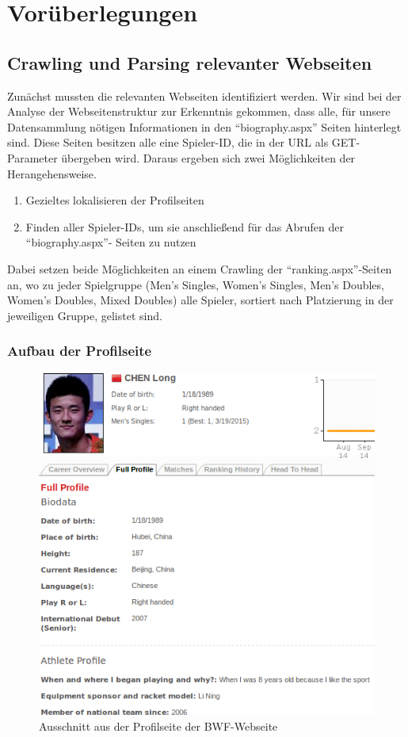 \chapter{Vorüberlegungen}
\section{Crawling und Parsing relevanter Webseiten}
Zunächst mussten die relevanten Webseiten identifiziert werden. Wir sind bei der Analyse der Webseitenstruktur zur Erkenntnis gekommen, dass alle, für unsere Datensammlung nötigen Informationen in den  "`biography.aspx"' Seiten hinterlegt sind. Diese Seiten besitzen alle eine Spieler-ID, die in der URL als GET-Parameter übergeben wird. Daraus ergeben sich zwei Möglichkeiten der Herangehensweise. 
\begin{enumerate}
\item Gezieltes lokalisieren der Profilseiten
\item Finden aller Spieler-IDs, um sie anschließend für das Abrufen der "`biography.aspx"'- Seiten zu nutzen
\end{enumerate}
Dabei setzen beide Möglichkeiten an einem Crawling der "`ranking.aspx"'-Seiten an, wo zu jeder Spielgruppe (Men's Singles, Women's Singles, Men's Doubles, Women's Doubles, Mixed Doubles) alle Spieler, sortiert nach Platzierung in der jeweiligen Gruppe, gelistet sind.

\subsection{Aufbau der Profilseite}
\begin{figure}[h!]
\centering
\includegraphics[scale=0.4]{images/bwf_profile}
\caption{Ausschnitt aus der Profilseite der BWF-Webseite}
\label{fig:bwf_profile}
\end{figure}

